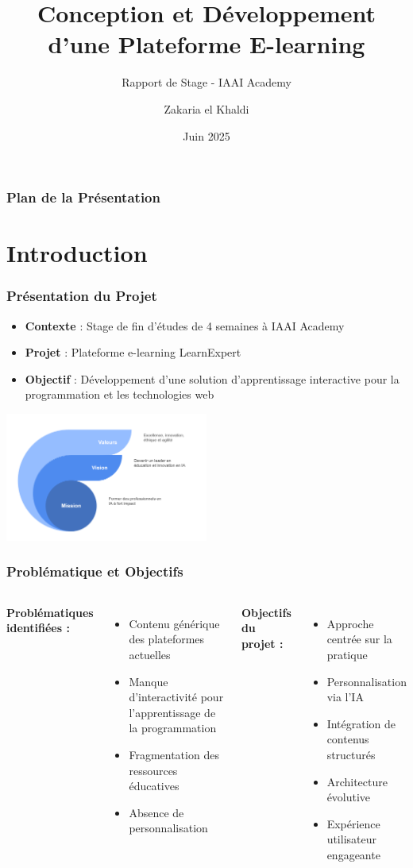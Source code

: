 \documentclass{beamer}
\title[Plateforme LearnExpert]{Conception et Développement d'une Plateforme E-learning}
\subtitle{Rapport de Stage - IAAI Academy}
\author[Zakaria el Khaldi]{Zakaria el Khaldi}
\institute[BTS Al-Kendi]{Centre BTS Al-Kendi de Casablanca}
\date{Juin 2025}
\begin{document}
\frame{\titlepage}

\begin{frame}
\frametitle{Plan de la Présentation}
\tableofcontents
\end{frame}

\section{Introduction}

\begin{frame}
\frametitle{Présentation du Projet}
\begin{itemize}
    \item \textbf{Contexte} : Stage de fin d'études de 4 semaines à IAAI Academy
    \item \textbf{Projet} : Plateforme e-learning LearnExpert
    \item \textbf{Objectif} : Développement d'une solution d'apprentissage interactive pour la programmation et les technologies web
\end{itemize}
\begin{center}
    \includegraphics[width=0.5\textwidth]{images/mession.png}
\end{center}
\end{frame}

\begin{frame}
\frametitle{Problématique et Objectifs}
\begin{columns}
\textbf{Problématiques identifiées :}
\begin{itemize}
    \item Contenu générique des plateformes actuelles
    \item Manque d'interactivité pour l'apprentissage de la programmation
    \item Fragmentation des ressources éducatives
    \item Absence de personnalisation
\end{itemize}

\textbf{Objectifs du projet :}
\begin{itemize}
    \item Approche centrée sur la pratique
    \item Personnalisation via l'IA
    \item Intégration de contenus structurés
    \item Architecture évolutive
    \item Expérience utilisateur engageante
\end{itemize}
\end{columns}
\end{frame}
\end{document}
